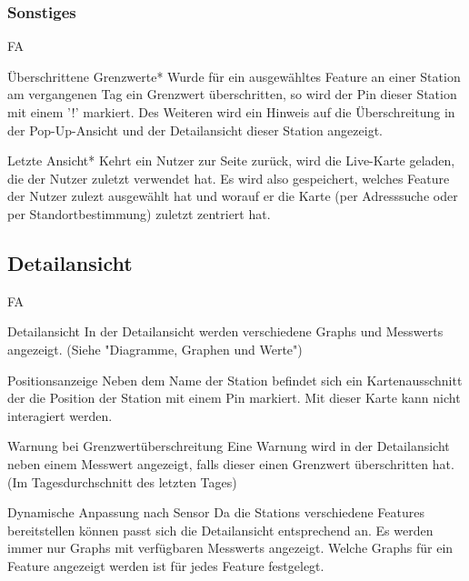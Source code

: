 \subsubsection*{Sonstiges}
\begin{Kriterien}{FA}
  \item[Überschrittene Grenzwerte*]
    Wurde für ein ausgewähltes \gls{Feature} an einer \gls{Station} am vergangenen Tag ein Grenzwert überschritten, so wird der 
    \gls{Pin} dieser \gls{Station} mit einem '!' markiert. Des Weiteren wird ein Hinweis auf die Überschreitung in der 
    Pop-Up-Ansicht und der \gls{Detailansicht} dieser \gls{Station} angezeigt.

  \item[Letzte Ansicht*]
    Kehrt ein Nutzer zur Seite zurück, wird die \gls{Live-Karte} geladen, die der Nutzer zuletzt verwendet hat. Es wird also 
    gespeichert, welches Feature der Nutzer zulezt ausgewählt hat und worauf er die Karte (per Adresssuche oder per 
    Standortbestimmung) zuletzt zentriert hat.
\end{Kriterien}


\subsection{Detailansicht}

\begin{Kriterien}{FA}
  \item[Detailansicht]
    In der Detailansicht werden verschiedene \glspl{Graph} und \glspl{Messwert} angezeigt. 
    (Siehe "Diagramme, Graphen und Werte")

  \item[Positionsanzeige]
    Neben dem Name der \gls{Station} befindet sich ein Kartenausschnitt der die Position der \gls{Station} mit einem \gls{Pin} 
    markiert. Mit dieser Karte kann nicht interagiert werden.

  \item[Warnung bei Grenzwertüberschreitung]
     Eine Warnung wird in der Detailansicht neben einem \gls{Messwert} angezeigt, falls dieser einen Grenzwert überschritten 
     hat. (Im Tagesdurchschnitt des letzten Tages)

  \item[Dynamische Anpassung nach Sensor]
    Da die \glspl{Station} verschiedene \glspl{Feature} bereitstellen können passt sich die Detailansicht entsprechend an. Es 
    werden immer nur \glspl{Graph} mit verfügbaren \glspl{Messwert} angezeigt. Welche \glspl{Graph} für ein \gls{Feature} 
    angezeigt werden ist für jedes \gls{Feature} festgelegt.
\end{Kriterien}


